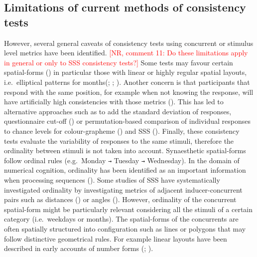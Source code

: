 \documentclass[
  man,
  longtable,
  a4paper,
  nolmodern,
  notxfonts,
  notimes,
  colorlinks=true,linkcolor=blue,citecolor=blue,urlcolor=blue]{apa7}
\begin{document}
\subsection{Limitations of current methods of consistency
tests}\label{limitations-of-current-methods-of-consistency-tests}

However, several general caveats of consistency tests using concurrent
or stimulus level metrics have been identified.
\textcolor{red}{[NR, comment 11: Do these limitations apply in general or only to SSS consistency tests?]}
Some tests may favour certain spatial-forms
() in particular those with
linear or highly regular spatial layouts, i.e.~elliptical patterns for
months(;
;
). Another concern is that
participants that respond with the same position, for example when not
knowing the response, will have artificially high consistencies with
those metrics (). This has
led to alternative approaches such as to add the standard deviation of
responses, questionnaire cut-off () or permutation-based comparison of individual responses to chance
levels for colour-grapheme ()
and SSS (). Finally, these
consistency tests evaluate the variability of responses to the same
stimuli, therefore the ordinality between stimuli is not taken into
account. Synaesthetic spatial-forms follow ordinal rules (e.g.~Monday
\texttt{→} Tuesday \texttt{→} Wednesday). In the domain of numerical
cognition, ordinality has been identified as an important information
when processing sequences (). Some studies of SSS have systematically investigated ordinality
by investigating metrics of adjacent inducer-concurrent pairs such as
distances () or angles
(). However, ordinality of
the concurrent spatial-form might be particularly relevant considering
all the stimuli of a certain category (i.e.~weekdays or months). The
spatial-forms of the concurrents are often spatially structured into
configuration such as lines or polygons that may follow distinctive
geometrical rules. For example linear layouts have been described in
early accounts of number forms (; ).
\end{document}
